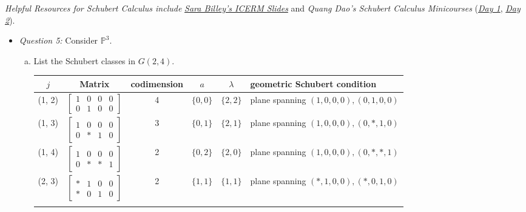 \textit{Helpful Resources for Schubert Calculus include}
\href{https://icerm.brown.edu/materials/Slides/sp-s13-off_weeks/Schubert_varieties_and_Schubert_calculus_%5D_Sara_Billey,_University_of_Washington.pdf)}{\textit{Sara Billey's ICERM Slides}} and \textit{Quang Dao's Schubert Calculus Minicourses} (\href{https://quangvdao.github.io/schubert-calculus-minicourse/day1.pdf}{\textit{Day 1}}, 
\href{https://quangvdao.github.io/schubert-calculus-minicourse/day2.pdf}{\textit{Day 2}}).

\begin{itemize}
    \item \textit{Question 5: } Consider $\mathbb{P}^3$. 

    \begin{enumerate}[a)]
        \item List the Schubert classes in $G(2, 4)$.

        \begin{tabular}{c | c | c | c | c | L}
        $j$ & Matrix & codimension & $a$ & $\lambda$ & geometric Schubert condition\\ \hline   
        
        \rule{0pt}{4ex}    

        (1, 2) & $\begin{bmatrix}
        1 & 0 & 0 & 0 \\
        0 & 1 & 0 & 0
        \end{bmatrix}$ & 4 & $\{0, 0\}$ & $\{2, 2\}$ & plane spanning $(1, 0, 0, 0), (0, 1, 0, 0)$ \\ \hline    
        \rule{0pt}{4ex}    

        (1, 3) & $\begin{bmatrix}
        1 & 0 & 0 & 0 \\
        0 & \ast & 1 & 0
        \end{bmatrix}$ & 3 & $\{0, 1\}$ & $\{2, 1\}$ & plane spanning $(1, 0, 0, 0), (0, \ast, 1, 0)$ \\ \hline \rule{0pt}{4ex}    

        (1, 4) & $\begin{bmatrix}
        1 & 0 & 0 & 0 \\
        0 & \ast & \ast & 1
        \end{bmatrix}$ & 2 & $\{0, 2\}$ & $\{2, 0\}$ & plane spanning $(1, 0, 0, 0), (0, \ast, \ast, 1)$ \\ \hline \rule{0pt}{4ex}    

        (2, 3) & $\begin{bmatrix}
        \ast & 1 & 0 & 0 \\
        \ast & 0 & 1 & 0
        \end{bmatrix}$ & 2 & $\{1, 1\}$ & $\{1, 1\}$ & plane spanning $(\ast, 1, 0, 0), (\ast, 0, 1, 0)$ \\ \hline \rule{0pt}{4ex}    


\end{tabular}
\end{enumerate}
\end{itemize}
